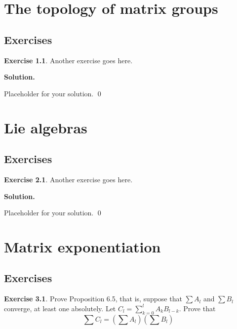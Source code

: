 \documentclass[12pt]{book}
\theoremstyle{definition}
\newtheorem{exercise}{Exercise}[chapter]
\newenvironment{solution}
{%
  \par\noindent\textbf{Solution.}\quad
}
{%
  \qed\par
}
\begin{document}
\chapter{The topology of matrix groups}
\section{Exercises}

\begin{exercise}
Another exercise goes here.
\end{exercise}

\begin{solution}
Placeholder for your solution.
\end{solution}

\chapter{Lie algebras}
\section{Exercises}

\begin{exercise}
Another exercise goes here.
\end{exercise}

\begin{solution}
Placeholder for your solution.
\end{solution}

\chapter{Matrix exponentiation}
\section{Exercises}

\begin{exercise}
Prove Proposition 6.5, that is, suppose that $\sum A_l$ and $\sum B_l$ converge, at least one absolutely.
Let $C_l = \sum_{k=0}^l A_kB_{l-k}$. Prove that
\[
\sum C_l = (\sum A_l)(\sum B_l)
\]
\end{exercise}
\end{document}
